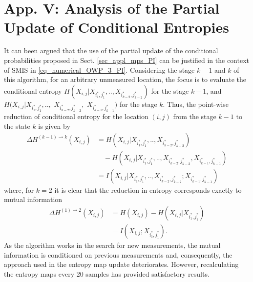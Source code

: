 \section{App. V: Analysis of the Partial Update of Conditional Entropies}
\label{appd_anal_partial_mi_upgrade_PI}

It can been argued that the use of the partial update of the conditional probabilities proposed in Sect. \ref{sec_appl_mps_PI} can be justified in the context of SMIS in  \eqref{eq_numerical_OWP_3_PI}. Considering the stage $k-1$ and $k$ of this algorithm, for an arbitrary unmeasured location, the focus is to evaluate the conditional entropy $H(X_{i,j}|X_{i^*_1,j^*_1},..,X_{i^*_{k-2},j^*_{k-2}})$ for the stage $k-1$, and $H(X_{i,j}|X_{i^*_1,j^*_1},..,$ $X_{i^*_{k-2},j^*_{k-2}},$ $X_{i^*_{k-1}, j^*_{k-1}})$ for the stage $k$. Thus, the point-wise reduction of conditional entropy for the location $(i,j)$ from the stage $k-1$ to the state $k$ is given by
\begin{align}\label{eq_appd_1_PI}
	\Delta H^{(k-1) \rightharpoonup k}(X_{i,j}) &= H(X_{i,j}|X_{i^*_1,j^*_1},..,X_{i^*_{k-2},j^*_{k-2}}) \nonumber\\
						& \quad - H(X_{i,j}|X_{i^*_1,j^*_1},..,X_{i^*_{k-2},j^*_{k-2}},X_{i^*_{k-1},j^*_{k-1}}) \nonumber\\
						&= I(X_{i,j} | X_{i^*_1,j^*_1},..,X_{i^*_{k-2},j^*_{k-2}};X_{i^*_{k-1},j^*_{k-1}})
\end{align}
where, for $k = 2$ it is clear that the reduction in entropy corresponds exactly to mutual information%
\begin{align}\label{eq_appd_2_PI}
	\Delta H^{(1) \rightharpoonup 2}(X_{i,j}) &= H(X_{i,j}) - H(X_{i,j}|X_{i^*_1,j^*_1}) \nonumber\\
												&= I(X_{i,j} ; X_{i^*_1,j^*_1}).
\end{align}
As the algorithm works in the search for new measurements, the mutual information is conditioned on previous measurements and, consequently, the approach used in the entropy map update deteriorates. However, recalculating the entropy maps every $20$ samples has provided satisfactory results.
